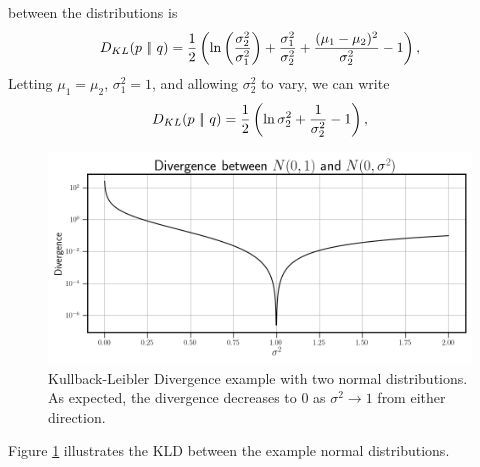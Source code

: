 between the distributions is
\begin{equation}
    D_{KL}(p\ |\!|\ q) = \frac{1}{2}\parens{\ln\parens{\frac{\sigma_2^2}{\sigma_1^2}} + 
    \frac{\sigma_1^2}{\sigma_2^2} + \frac{(\mu_1 - \mu_2)^2}{\sigma_2^2} - 1}, \label{eqn:normal divergence}
\end{equation}
Letting $\mu_1 = \mu_2$, $\sigma_1^2 = 1$, and allowing $\sigma_2^2$ to vary, we can 
write 
\begin{equation}
    D_{KL}(p\ |\!|\ q) = \frac{1}{2}\left(\ln\sigma_2^2 + 
    \frac{1}{\sigma_2^2} - 1\right), \label{eqn:normal divergence2}
\end{equation}
\begin{figure}[ht]
    \centering
    \begin{minipage}{\textwidth}
        \includegraphics[width=\textwidth]{../Figures/divergence_example.png}
    \end{minipage} 
    \caption{Kullback-Leibler Divergence example with two normal distributions. As expected, the divergence 
    decreases to 0 as $\sigma^2 \to 1$ from either direction.}
    \label{fig:divergence example}
\end{figure}
Figure \ref{fig:divergence example} illustrates the KLD between the example normal distributions.

